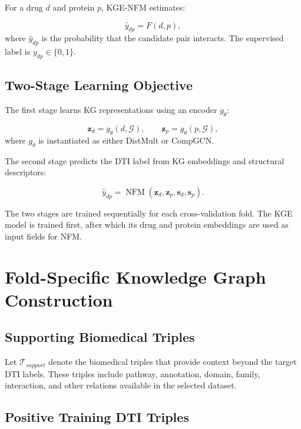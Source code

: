 For a drug $d$ and protein $p$, KGE-NFM estimates:

\begin{equation}
    \hat{y}_{dp}=F(d,p),
\end{equation}
where $\hat{y}_{dp}$ is the probability that the candidate pair interacts.
The supervised label is $y_{dp}\in\{0,1\}$.

\subsection{Two-Stage Learning Objective}

The first stage learns KG representations using an encoder
$g_{\theta}$:

\begin{equation}
    \mathbf{z}_{d}=g_{\theta}(d,\mathcal{G}),
    \qquad
    \mathbf{z}_{p}=g_{\theta}(p,\mathcal{G}),
\end{equation}
where $g_{\theta}$ is instantiated as either DistMult or CompGCN.

The second stage predicts the DTI label from KG embeddings and structural
descriptors:

\begin{equation}
    \hat{y}_{dp}
    =
    \operatorname{NFM}
    \left(
        \mathbf{z}_{d},
        \mathbf{z}_{p},
        \mathbf{s}_{d},
        \mathbf{s}_{p}
    \right).
\end{equation}

The two stages are trained sequentially for each cross-validation fold. The
KGE model is trained first, after which its drug and protein embeddings are
used as input fields for NFM.

\section{Fold-Specific Knowledge Graph Construction}

\subsection{Supporting Biomedical Triples}

Let $\mathcal{T}_{support}$ denote the biomedical triples that provide context
beyond the target DTI labels. These triples include pathway, annotation,
domain, family, interaction, and other relations available in the selected
dataset.

\subsection{Positive Training DTI Triples}

